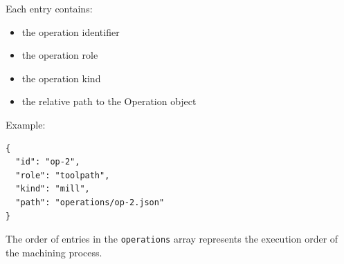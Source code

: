 Each entry contains:

\begin{itemize}
\item the operation identifier
\item the operation role
\item the operation kind
\item the relative path to the Operation object
\end{itemize}

Example:

\begin{verbatim}
{
  "id": "op-2",
  "role": "toolpath",
  "kind": "mill",
  "path": "operations/op-2.json"
}
\end{verbatim}

The order of entries in the \texttt{operations} array represents the execution order of the machining process.
